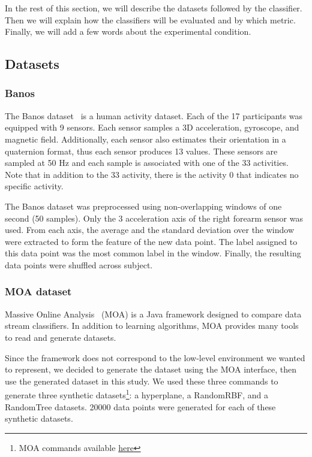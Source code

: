 In the rest of this section, we will describe the
datasets followed by the classifier. Then we
will explain how the classifiers will be evaluated
and by which metric. Finally, we will add a few
words about the experimental condition.

\subsection{Datasets}
\subsubsection{Banos}
The Banos dataset~\cite{Banos_2014} is a human
activity dataset. Each of the 17 participants was
equipped with 9 sensors. Each sensor samples a 3D
acceleration, gyroscope, and magnetic field.
Additionally, each sensor also estimates their
orientation in a quaternion format, thus each
sensor produces 13 values. These sensors are
sampled at 50 Hz and each sample is associated
with one of the 33 activities. Note that in
addition to the 33 activity, there is the activity
0 that indicates no specific activity.

The Banos dataset was preprocessed using
non-overlapping windows of one second (50
samples).  Only the 3 acceleration axis of the
right forearm sensor was used. From each axis, the
average and the standard deviation over the window
were extracted to form the feature of the new data
point. The label assigned to this data
point was the most common label in the window.
Finally, the resulting data points were shuffled
across subject.


\subsubsection{MOA dataset}
Massive Online Analysis~\cite{moa} (MOA) is a Java framework designed to compare
data stream classifiers. In addition to learning algorithms, MOA provides many
tools to read and generate datasets.

Since the framework does not correspond to the low-level environment we wanted
to represent, we decided to generate the dataset using the MOA interface, then
use the generated dataset in this study.  We used these three commands to
generate three synthetic datasets\footnote{MOA commands available
\href{https://github.com/azazel7/paper-benchmark/blob/e0c9a94d0d17490f7ab14293dec20b8322a6447c/Makefile\#L90}{here}}:
a hyperplane, a RandomRBF, and a RandomTree
datasets. 20000 data points were
generated for each of these synthetic datasets.

